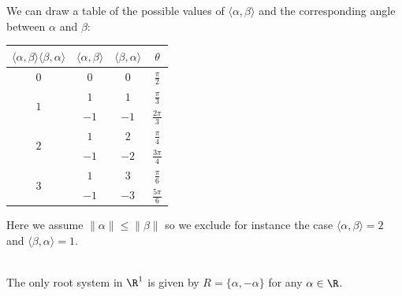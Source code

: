\documentclass[a4paper]{article}
\begin{document}
We can draw a table of the possible values of $\langle\alpha,\beta\rangle$ and the corresponding angle between $\alpha$ and $\beta$: 

\begin{table}[!h]
\centering
\begin{tabular}{|c|c|c|c|}
\hline
$\langle\alpha,\beta\rangle\langle\beta,\alpha\rangle$ & $\langle\alpha,\beta\rangle$ & $\langle\beta,\alpha\rangle$ & $\theta$         \\ \hline
$0$                                                    & $0$                          & $0$                          & $\frac{\pi}{2}$  \\[1.5ex] \hline
\multirow{2}{*}{$1$}                                   & $1$                          & $1$                          & $\frac{\pi}{3}$  \\[1.5ex] \cline{2-4} 
                                                       & $-1$                         & $-1$                         & $\frac{2\pi}{3}$ \\[1.5ex] \hline
\multirow{2}{*}{$2$}                                   & $1$                          & $2$                          & $\frac{\pi}{4}$  \\[1.5ex] \cline{2-4} 
                                                       & $-1$                         & $-2$                         & $\frac{3\pi}{4}$ \\[1.5ex] \hline
\multirow{2}{*}{$3$}                                   & $1$                          & $3$                          & $\frac{\pi}{6}$  \\[1.5ex] \cline{2-4} 
                                                       & $-1$                         & $-3$                         & $\frac{5\pi}{6}$ \\[1.5ex] \hline
\end{tabular}
\end{table}

Here we assume $\|\alpha\|\leq\|\beta\|$ so we exclude for instance the case $\langle\alpha,\beta\rangle=2$ and $\langle\beta,\alpha\rangle=1$. 

\begin{prp}{}{} \\The only root system in $\R^1$ is given by $R=\{\alpha,-\alpha\}$ for any $\alpha\in\R$. 
\end{prp}
\end{document}
